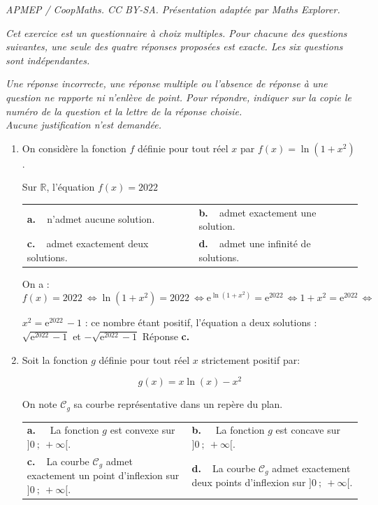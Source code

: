 \documentclass[10pt]{article}
\providecommand{\R}{\mathbb{R}}
\providecommand{\np}[2][]{{#2~#1}}
\begin{document}
\noindent\textit{APMEP / CoopMaths. CC BY-SA. Présentation adaptée par Maths Explorer.}\par\medskip
\medskip

\emph{Cet exercice est un questionnaire à choix multiples. Pour chacune des questions suivantes, une seule des quatre réponses proposées est exacte. Les six questions sont indépendantes.}

\smallskip

\emph{Une réponse incorrecte, une réponse multiple ou l'absence de réponse à une question ne rapporte ni n'enlève de point. Pour répondre, indiquer sur la copie le numéro de la question et la lettre de la réponse choisie.\\
Aucune justification n'est demandée.}

\medskip

\begin{enumerate}
\item On considère la fonction $f$ définie pour tout réel $x$ par $f(x) = \ln \left(1 + x^2\right)$.

Sur $\R$, l'équation $f(x) = \np{2022}$

\begin{center}
\begin{tabularx}{\linewidth}{*{2}{X}}
\textbf{a.~~}n'admet aucune solution. &\textbf{b.~~}admet exactement une solution.\\
\textbf{c.~~}admet exactement deux solutions.&\textbf{d.~~}admet une infinité de solutions.
\end{tabularx}
\end{center}
On a : $f(x) = \np{2022} \iff \ln \left(1 + x^2\right) = \np{2022} \iff \text{e}^{\ln \left(1 + x^2\right)} = \text{e}^{\np{2022}} \iff 1 + x^2 = \text{e}^{\np{2022}} \iff$

$ x^2 = \text{e}^{\np{2022}} - 1$ : ce nombre étant positif, l'équation a deux solutions : $\sqrt{\text{e}^{\np{2022}} - 1}$ et $- \sqrt{\text{e}^{\np{2022}} - 1}$  Réponse \textbf{c.}

\item Soit la fonction $g$ définie pour tout réel $x$ strictement positif par:

\[g(x) = x \ln (x) - x^2\]

On note $\mathcal{C}_g$ sa courbe représentative dans un repère du plan.

\begin{center}
\begin{tabularx}{\linewidth}{*{2}{X}}
\textbf{a.~~} La fonction $g$ est convexe sur $]0~;~+\infty[$.&\textbf{b.~~} La fonction $g$ est concave sur $]0~;~+\infty[$.\\
\textbf{c.~~}La courbe $\mathcal{C}_g$ admet exactement un point d'inflexion sur $]0~;~+\infty[$.&\textbf{d.~~}La courbe $\mathcal{C}_g$ admet exactement
deux points d'inflexion sur $]0~;~+\infty[$.
\end{tabularx}
\end{center}


\end{enumerate}
\end{document}
